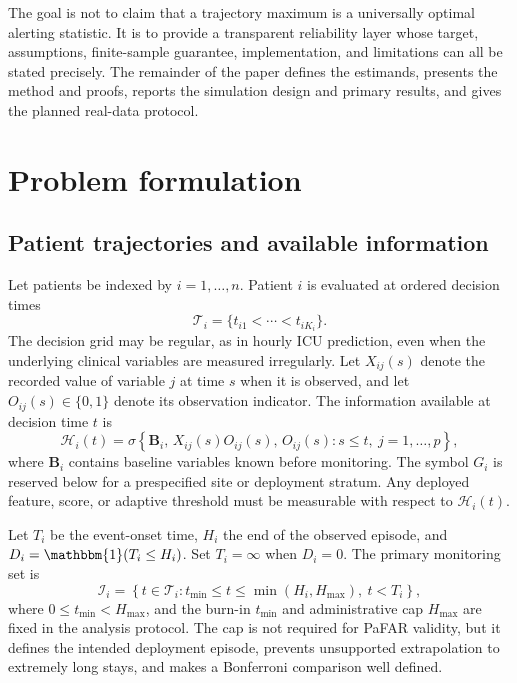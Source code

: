 \documentclass[11pt]{article}
\newcommand{\Ind}{\mathbbm{1}}
\newcommand{\calH}{\mathcal{H}}
\newcommand{\calI}{\mathcal{I}}
\newcommand{\calT}{\mathcal{T}}
\begin{document}
The goal is not to claim that a trajectory maximum is a universally optimal alerting statistic. It is to provide a transparent reliability layer whose target, assumptions, finite-sample guarantee, implementation, and limitations can all be stated precisely. The remainder of the paper defines the estimands, presents the method and proofs, reports the simulation design and primary results, and gives the planned real-data protocol.
\section{Problem formulation}\label{sec:formulation}

\subsection{Patient trajectories and available information}

Let patients be indexed by $i=1,\ldots,n$. Patient $i$ is evaluated at ordered decision times
\[
\calT_i=\{t_{i1}<\cdots<t_{iK_i}\}.
\]
The decision grid may be regular, as in hourly ICU prediction, even when the underlying clinical variables are measured irregularly. Let $X_{ij}(s)$ denote the recorded value of variable $j$ at time $s$ when it is observed, and let $O_{ij}(s)\in\{0,1\}$ denote its observation indicator. The information available at decision time $t$ is
\begin{equation}
\calH_i(t)=\sigma\!\left\{\bm B_i,\,X_{ij}(s)O_{ij}(s),\,O_{ij}(s):s\le t,\ j=1,\ldots,p\right\},
\label{eq:history}
\end{equation}
where $\bm B_i$ contains baseline variables known before monitoring. The symbol $G_i$ is reserved below for a prespecified site or deployment stratum. Any deployed feature, score, or adaptive threshold must be measurable with respect to $\calH_i(t)$.

Let $T_i$ be the event-onset time, $H_i$ the end of the observed episode, and $D_i=\Ind(T_i\le H_i)$. Set $T_i=\infty$ when $D_i=0$. The primary monitoring set is
\begin{equation}
\calI_i=\left\{t\in\calT_i:t_{\min}\le t\le \min(H_i,H_{\max}),\ t<T_i\right\},
\label{eq:monitoring-set}
\end{equation}
where $0\le t_{\min}<H_{\max}$, and the burn-in $t_{\min}$ and administrative cap $H_{\max}$ are fixed in the analysis protocol. The cap is not required for PaFAR validity, but it defines the intended deployment episode, prevents unsupported extrapolation to extremely long stays, and makes a Bonferroni comparison well defined.
\end{document}
